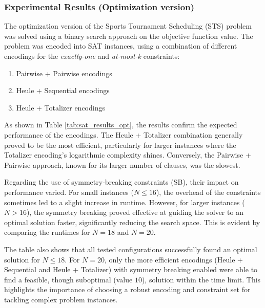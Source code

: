 \documentclass{article}
\begin{document}
\subsubsection{Experimental Results (Optimization version)}
The optimization version of the Sports Tournament Scheduling (STS) problem was solved using a binary search approach on the objective function value. The problem was encoded into SAT instances, using a combination of different encodings for the \textit{exactly-one} and \textit{at-most-k} constraints:

\begin{enumerate}
\item Pairwise + Pairwise encodings
\item Heule + Sequential encodings
\item Heule + Totalizer encodings
\end{enumerate}

As shown in Table \ref{tab:sat_results_opt}, the results confirm the expected performance of the encodings. The Heule + Totalizer combination generally proved to be the most efficient, particularly for larger instances where the Totalizer encoding's logarithmic complexity shines. Conversely, the Pairwise + Pairwise approach, known for its larger number of clauses, was the slowest.

Regarding the use of symmetry-breaking constraints (SB), their impact on performance varied. For small instances ($N\le16$), the overhead of the constraints sometimes led to a slight increase in runtime. However, for larger instances ($N>16$), the symmetry breaking proved effective at guiding the solver to an optimal solution faster, significantly reducing the search space. This is evident by comparing the runtimes for $N=18$ and $N=20$.

The table also shows that all tested configurations successfully found an optimal solution for $N\le18$. For $N=20$, only the more efficient encodings (Heule + Sequential and Heule + Totalizer) with symmetry breaking enabled were able to find a feasible, though suboptimal (value $10$), solution within the time limit. This highlights the importance of choosing a robust encoding and constraint set for tackling complex problem instances.
\end{document}
